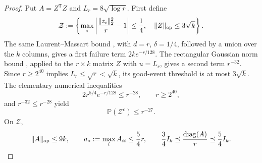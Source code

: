 \begin{proof}
Put \(A=Z^{\mathsf T}Z\) and
\(L_r=8\sqrt{\log r}\). First define
\begin{equation}
  \mathcal Z
  :=\left\{
    \max_i\left|\frac{\|z_i\|_2^2}{r}-1\right|\le\frac14,
    \quad \|Z\|_{\rm op}\le3\sqrt k
  \right\}.                                                \label{eq:step-003-4}
\end{equation}
The same Laurent--Massart bound \citep[Lemma~1]{laurentMassart2000}, with
\(d=r\), \(\delta=1/4\), followed by a
union over the \(k\) columns, gives a first failure term
\(2ke^{-r/128}\). The rectangular Gaussian norm bound
\citep[Theorem~II.13]{davidsonSzarek2001}, applied to the \(r\times k\)
matrix \(Z\) with \(u=L_r\), gives
a second term \(r^{-32}\). Since \(r\ge2^{40}\) implies
\(L_r\le\sqrt r<\sqrt k\), its good-event threshold is at most
\(3\sqrt k\). The elementary numerical inequalities
\begin{equation}
  2r^{5/4}e^{-r/128}\le r^{-28},
  \qquad r\ge2^{40},                                       \label{eq:step-003-5}
\end{equation}
and \(r^{-32}\le r^{-28}\) yield
\begin{equation}
  \mathbb P(\mathcal Z^c)\le r^{-27}.                     \label{eq:step-003-6}
\end{equation}
On \(\mathcal Z\),
\begin{equation}
  \|A\|_{\rm op}\le9k,\qquad
  a_*:=\max_i A_{ii}\le\frac54r,\qquad
  \frac34I_k\preceq\frac{\operatorname{diag}(A)}r
    \preceq\frac54I_k.                                    \label{eq:step-003-7}
\end{equation}


\end{proof}
